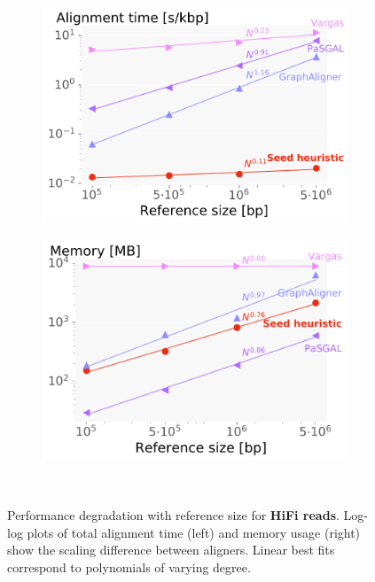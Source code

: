 \begin{figure}[t]
  \begin{subfigure}{.45\textwidth}
    \centering
    \includegraphics[width=\linewidth]{figures/hifi_spkb_vs_refsize-headxspkb.pdf}
  \end{subfigure}%
  \begin{subfigure}{.45\textwidth}
    \centering
    \includegraphics[width=\linewidth]{figures/hifi_memory_vs_refsize-headxmax_rss.pdf}
  \end{subfigure}~\hspace{1em} \caption[Performance scaling with reference size
  (long reads)]{Performance degradation with reference size for \textbf{HiFi
  reads}. Log-log plots of total alignment time (left) and memory usage (right)
  show the scaling difference between aligners. Linear best fits correspond to
  polynomials of varying degree.}
  \label{SEEDfig:hifi_scaling_with_genomesize}
\end{figure}

